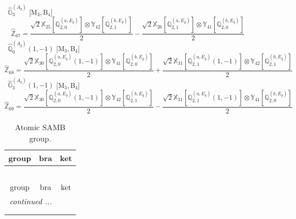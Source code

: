 \documentclass[fleqn,10pt,landscape]{article}
\begin{document}
\begin{itemize}
\noindent {} $\,\,\,\hat{\mathbb{G}}_{3}^{(A_{g})}$ [M$_{3}$,\,B$_{4}$]
\begin{dmath*}
\hat{\mathbb{Z}}_{67}=\frac{\sqrt{2} \mathbb{X}_{25}[\mathbb{Q}_{2,0}^{(a,E_{g})}] \otimes\mathbb{Y}_{42}[\mathbb{Q}_{2,1}^{(b,E_{g})}]}{2} - \frac{\sqrt{2} \mathbb{X}_{26}[\mathbb{Q}_{2,1}^{(a,E_{g})}] \otimes\mathbb{Y}_{41}[\mathbb{Q}_{2,0}^{(b,E_{g})}]}{2}
\end{dmath*}
\vspace{4mm}
\noindent {} $\,\,\,\hat{\mathbb{Q}}_{0}^{(A_{g})}(1,-1)$ [M$_{3}$,\,B$_{4}$]
\begin{dmath*}
\hat{\mathbb{Z}}_{68}=\frac{\sqrt{2} \mathbb{X}_{30}[\mathbb{Q}_{2,0}^{(a,E_{g})}(1,-1)] \otimes\mathbb{Y}_{41}[\mathbb{Q}_{2,0}^{(b,E_{g})}]}{2} + \frac{\sqrt{2} \mathbb{X}_{31}[\mathbb{Q}_{2,1}^{(a,E_{g})}(1,-1)] \otimes\mathbb{Y}_{42}[\mathbb{Q}_{2,1}^{(b,E_{g})}]}{2}
\end{dmath*}
\vspace{4mm}
\noindent {} $\,\,\,\hat{\mathbb{G}}_{3}^{(A_{g})}(1,-1)$ [M$_{3}$,\,B$_{4}$]
\begin{dmath*}
\hat{\mathbb{Z}}_{69}=\frac{\sqrt{2} \mathbb{X}_{30}[\mathbb{Q}_{2,0}^{(a,E_{g})}(1,-1)] \otimes\mathbb{Y}_{42}[\mathbb{Q}_{2,1}^{(b,E_{g})}]}{2} - \frac{\sqrt{2} \mathbb{X}_{31}[\mathbb{Q}_{2,1}^{(a,E_{g})}(1,-1)] \otimes\mathbb{Y}_{41}[\mathbb{Q}_{2,0}^{(b,E_{g})}]}{2}
\end{dmath*}
\begin{center}
\renewcommand{\arraystretch}{1.3}
\begin{longtable}{c|c|c}
\caption{Atomic SAMB group.}
 \\
 \hline \hline
group & bra & ket \\ \hline \endfirsthead

\multicolumn{2}{l}{\tablename\ \thetable{}} \\
 \hline \hline
group & bra & ket \\ \hline \endhead

 \hline \hline
\multicolumn{2}{r}{\footnotesize\it continued ...} \\ \endfoot

 \hline \hline
\multicolumn{2}{r}{} \\ \endlastfoot


\end{longtable}
\end{center}
\end{itemize}
\end{document}
